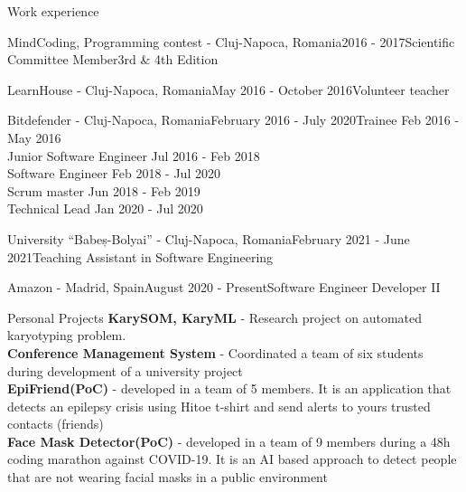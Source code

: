 \documentclass{resume} %
\begin{document}
\begin{rSection}{Work experience}

    \begin{rSubsection}{MindCoding, Programming contest - Cluj-Napoca, Romania}{2016 - 2017}{Scientific Committee Member}{3rd \& 4th Edition}
    \end{rSubsection}
    \begin{rSubsection}{LearnHouse - Cluj-Napoca, Romania}{May 2016 - October 2016}{Volunteer teacher}{}
    \end{rSubsection}
    \begin{rSubsection}{Bitdefender - Cluj-Napoca, Romania}{February 2016 - July 2020}{Trainee \hfill Feb 2016 - May 2016}{\\Junior Software Engineer \hfill Jul 2016 - Feb 2018\\Software Engineer \hfill Feb 2018 - Jul 2020\\Scrum master \hfill Jun 2018 - Feb 2019\\Technical Lead \hfill Jan 2020 - Jul 2020}{}
    \end{rSubsection}
    \begin{rSubsection}{University “Babeș-Bolyai” - Cluj-Napoca, Romania}{February 2021 - June 2021}{Teaching Assistant in Software Engineering}{}
    \end{rSubsection}
    \begin{rSubsection}{Amazon - Madrid, Spain}{August 2020 - Present}{Software Engineer Developer II}{}
    \end{rSubsection}

\end{rSection}
\begin{rSection}{Personal Projects}
{\bf KarySOM, KaryML} - Research project on automated karyotyping problem.\\
{\bf Conference Management System} - Coordinated a team of six students during development of a university project\\
{\bf EpiFriend(PoC)} - developed in a team of 5 members. It is an application that detects an epilepsy crisis using Hitoe t-shirt and send alerts to yours trusted contacts (friends)\\
{\bf Face Mask Detector(PoC)} - developed in a team of 9 members during a 48h coding marathon against COVID-19. It is an AI based approach to detect people that are not wearing facial masks in a public environment
\end{rSection}
\end{document}
